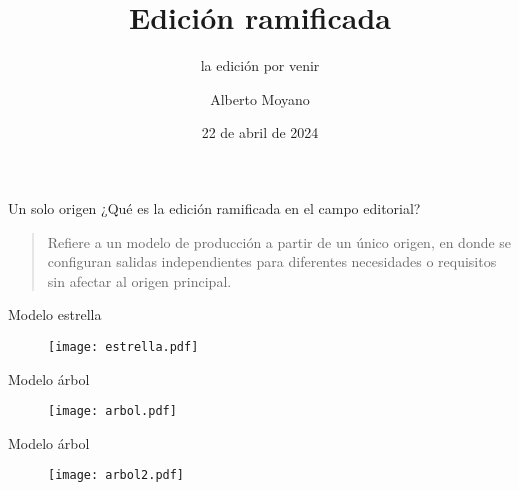 \documentclass[14pt,aspectratio=169]{beamer}
\title{Edición ramificada}
\subtitle{la edición por venir}
\author{Alberto Moyano}
\date{22 de abril de 2024}
\institute{\url{https://github.com/albertomoyano/CHARLAUBA2}}
\begin{document}
	\begin{frame}
		\titlepage
	\end{frame}

\begin{frame}{Un solo origen}
	¿Qué es la edición ramificada en el campo editorial?\vspace{14pt}

	\begin{quote}
	Refiere a un modelo de producción a partir de un único origen, en donde se configuran salidas independientes para diferentes necesidades o requisitos sin afectar al origen principal.
	\end{quote}
\end{frame}

\begin{frame}{Modelo estrella}
	\begin{figure}
		\centering
		\texttt{[image: estrella.pdf]}
	\end{figure}
\end{frame}

\begin{frame}{Modelo árbol}
	\begin{figure}
		\centering
		\texttt{[image: arbol.pdf]}
	\end{figure}
\end{frame}

\begin{frame}{Modelo árbol}
	\begin{figure}
		\centering
		\texttt{[image: arbol2.pdf]}
	\end{figure}
\end{frame}
\end{document}
